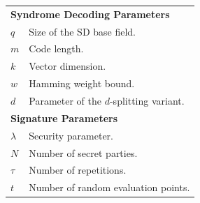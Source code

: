 \documentclass[11pt]{report}
\theoremstyle{definition}
\theoremstyle{plain}
\begin{document}
\begin{table}[]
  \begin{tabular}{p{}p{}}
    \hline
    \multicolumn{2}{l}{\textbf{Syndrome Decoding Parameters}}                                                                             \\
    $q$                          & Size of the SD base field.                                                                             \\
    $m$                          & Code length.                                                                                           \\
    $k$                          & Vector dimension.                                                                                      \\
    $w$                          & Hamming weight bound.                                                                                  \\
    $d$                          & Parameter of the $d$-splitting variant.                                                                \\ \hline

    \multicolumn{2}{l}{\textbf{Signature Parameters}}                                                                                     \\
    $\lambda$                    & Security parameter.                                                                                    \\
    $N$                          & Number of secret parties.                                                                              \\
    $\tau$                       & Number of repetitions.                                                                                 \\
    $t$                          & Number of random evaluation points.                                                                    \\ \hline


\end{tabular}
\end{table}
\end{document}
